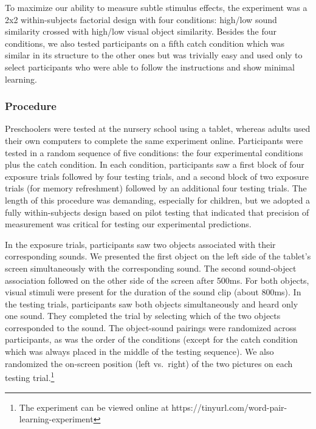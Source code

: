 \documentclass[english,,man,floatsintext]{apa6}
\let\rmarkdownfootnote\footnote%
\def\footnote{\protect\rmarkdownfootnote}
\theoremstyle{definition}
\theoremstyle{definition}
\theoremstyle{definition}
\theoremstyle{remark}
\begin{document}
To maximize our ability to measure subtle stimulus effects, the
experiment was a 2x2 within-subjects factorial design with four
conditions: high/low sound similarity crossed with high/low visual
object similarity. Besides the four conditions, we also tested
participants on a fifth catch condition which was similar in its
structure to the other ones but was trivially easy and used only to
select participants who were able to follow the instructions and show
minimal learning.

\subsubsection{Procedure}\label{procedure}

Preschoolers were tested at the nursery school using a tablet, whereas
adults used their own computers to complete the same experiment online.
Participants were tested in a random sequence of five conditions: the
four experimental conditions plus the catch condition. In each
condition, participants saw a first block of four exposure trials
followed by four testing trials, and a second block of two exposure
trials (for memory refreshment) followed by an additional four testing
trials. The length of this procedure was demanding, especially for
children, but we adopted a fully within-subjects design based on pilot
testing that indicated that precision of measurement was critical for
testing our experimental predictions.

In the exposure trials, participants saw two objects associated with
their corresponding sounds. We presented the first object on the left
side of the tablet's screen simultaneously with the corresponding sound.
The second sound-object association followed on the other side of the
screen after 500ms. For both objects, visual stimuli were present for
the duration of the sound clip (about 800ms). In the testing trials,
participants saw both objects simultaneously and heard only one sound.
They completed the trial by selecting which of the two objects
corresponded to the sound. The object-sound pairings were randomized
across participants, as was the order of the conditions (except for the
catch condition which was always placed in the middle of the testing
sequence). We also randomized the on-screen position (left vs.~right) of
the two pictures on each testing
trial.\footnote{The experiment can be viewed online at https://tinyurl.com/word-pair-learning-experiment}
\end{document}
